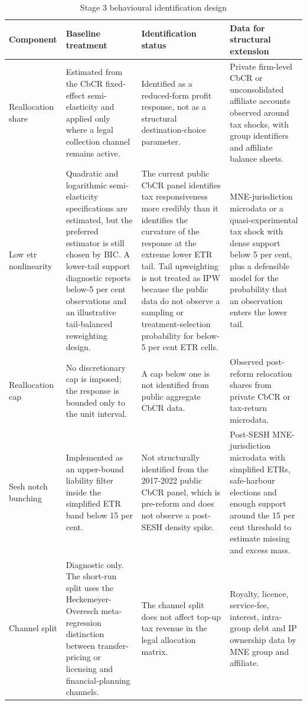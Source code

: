 \begin{table}[H]
\centering
\scriptsize
\caption{Stage 3 behavioural identification design}
\label{tab:app_stage3_behavioural_design}
\begin{adjustbox}{max width=\textwidth,center}
\begin{tabular}{@{}L{2.7cm}L{4.1cm}L{3.7cm}L{5.1cm}@{}}
\toprule
Component & Baseline treatment & Identification status & Data for structural extension \\
\midrule
Reallocation share & Estimated from the CbCR fixed-effect semi-elasticity and applied only where a legal collection channel remains active. & Identified as a reduced-form profit response, not as a structural destination-choice parameter. & Private firm-level CbCR or unconsolidated affiliate accounts observed around tax shocks, with group identifiers and affiliate balance sheets. \\
Low etr nonlinearity & Quadratic and logarithmic semi-elasticity specifications are estimated, but the preferred estimator is still chosen by BIC. A lower-tail support diagnostic reports below-5 per cent observations and an illustrative tail-balanced reweighting design. & The current public CbCR panel identifies tax responsiveness more credibly than it identifies the curvature of the response at the extreme lower ETR tail. Tail upweighting is not treated as IPW because the public data do not observe a sampling or treatment-selection probability for below-5 per cent ETR cells. & MNE-jurisdiction microdata or a quasi-experimental tax shock with dense support below 5 per cent, plus a defensible model for the probability that an observation enters the lower tail. \\
Reallocation cap & No discretionary cap is imposed; the response is bounded only to the unit interval. & A cap below one is not identified from public aggregate CbCR data. & Observed post-reform relocation shares from private CbCR or tax-return microdata. \\
Sesh notch bunching & Implemented as an upper-bound liability filter inside the simplified ETR band below 15 per cent. & Not structurally identified from the 2017-2022 public CbCR panel, which is pre-reform and does not observe a post-SESH density spike. & Post-SESH MNE-jurisdiction microdata with simplified ETRs, safe-harbour elections and enough support around the 15 per cent threshold to estimate missing and excess mass. \\
Channel split & Diagnostic only. The short-run split uses the Heckemeyer-Overesch meta-regression distinction between transfer-pricing or licensing and financial-planning channels. & The channel split does not affect top-up tax revenue in the legal allocation matrix. & Royalty, licence, service-fee, interest, intra-group debt and IP ownership data by MNE group and affiliate. \\

\end{tabular}
\end{adjustbox}
\end{table}
